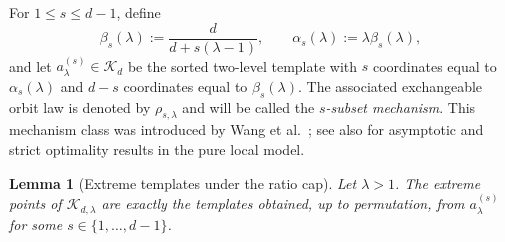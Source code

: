 \documentclass[11pt]{amsart}
\newtheorem{lemma}[lemma]{Lemma}
\theoremstyle{definition}
\newcommand{\cK}{\mathcal K}
\begin{document}
For $1\le s\le d-1$, define
\[
\beta_s(\lambda):=\frac{d}{d+s(\lambda-1)},
\qquad
\alpha_s(\lambda):=\lambda \beta_s(\lambda),
\]
and let $a^{(s)}_\lambda\in\cK_d$ be the sorted two-level template with $s$ coordinates equal to $\alpha_s(\lambda)$ and $d-s$ coordinates equal to $\beta_s(\lambda)$. The associated exchangeable orbit law is denoted by $\rho_{s,\lambda}$ and will be called the \emph{$s$-subset mechanism}. This mechanism class was introduced by Wang et al.\ \cite{wang-ldp}; see also \cite{ye-barg,pan-strict} for asymptotic and strict optimality results in the pure local model.

\begin{lemma}[Extreme templates under the ratio cap]\label{lem:raw-extreme}
Let $\lambda>1$. The extreme points of $\cK_{d,\lambda}$ are exactly the templates obtained, up to permutation, from $a^{(s)}_\lambda$ for some $s\in\{1,\dots,d-1\}$.
\end{lemma}
\end{document}

